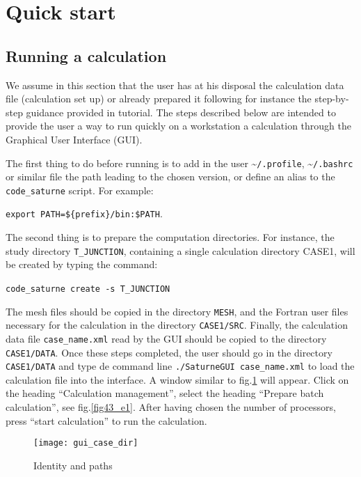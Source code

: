 \section{Quick start}
\subsection{Running a calculation}
We assume in this section that the user has at his disposal the calculation data file (calculation set up) or already prepared it following for instance the step-by-step guidance provided in \CS tutorial. The steps described below are intended to provide the user a way to run quickly on a workstation a calculation through the Graphical User Interface (GUI).

The first thing to do before running \CS is to add in the user \textasciitilde\texttt{/.profile}, \textasciitilde\texttt{/.bashrc} or similar file the path
leading to the chosen \CS version, or define an alias to the \texttt{code\_saturne} script. For example:\
\begin{center}
\texttt{export PATH=\$\{prefix\}/bin:\$PATH}.\
\end{center}
The second thing is to prepare the computation directories. For instance, the study directory \texttt{T\_JUNCTION}, containing a single calculation directory CASE1, will be created by typing the command:\
\begin{center}
\texttt{code\_saturne create -s T\_JUNCTION}\
\end{center}
The mesh files should be copied in the directory \texttt{MESH}, and the Fortran user files necessary for the calculation in the directory \texttt{CASE1/SRC}.  Finally, the calculation data file \texttt{case\_name.xml} read by the GUI should be copied to the directory \texttt{CASE1/DATA}.
Once these steps completed, the user should go in the directory \texttt{CASE1/DATA} and type de command line \texttt{./SaturneGUI case\_name.xml} to load the calculation file into the interface. A window similar to fig.\ref{fig3_e1} will appear. Click on the heading ``Calculation management'', select the heading ``Prepare batch calculation'', see fig.\ref{fig43_e1}. After having chosen the number of processors, press ``start calculation'' to run the calculation.

\begin{figure}[!ht]
\begin{center}
\texttt{[image: gui\_case\_dir]}
\caption{Identity and paths}
\label{fig3_e1}
\end{center}
\end{figure}


